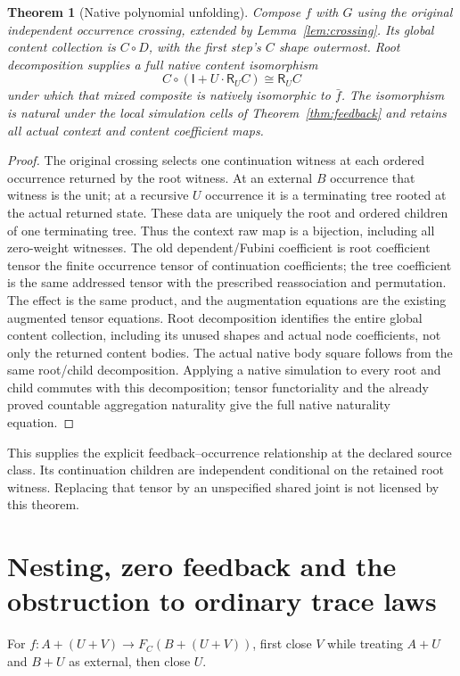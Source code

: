 \documentclass[11pt]{article}
\newtheorem{theorem}{Theorem}\newtheorem{lemma}[theorem]{Lemma}\newtheorem{proposition}[theorem]{Proposition}
\newcommand{\R}{\mathsf R}\newcommand{\Col}{\mathsf{Col}}\newcommand{\Vect}{\mathbf{Vect}_k}
\begin{document}
\begin{theorem}[Native polynomial unfolding]\label{thm:unfolding}
Compose $f$ with $G$ using the original independent occurrence crossing, extended by Lemma~\ref{lem:crossing}. Its global content collection is $C\circ D$, with the first step's $C$ shape outermost. Root decomposition supplies a full native content isomorphism
\[
 C\circ(\mathsf I+U\cdot\R_U C)\cong\R_U C
\]
under which that mixed composite is natively isomorphic to $\bar f$. The isomorphism is natural under the local simulation cells of Theorem~\ref{thm:feedback} and retains all actual context and content coefficient maps.
\end{theorem}
\begin{proof}
The original crossing selects one continuation witness at each ordered occurrence returned by the root witness. At an external $B$ occurrence that witness is the unit; at a recursive $U$ occurrence it is a terminating tree rooted at the actual returned state. These data are uniquely the root and ordered children of one terminating tree. Thus the context raw map is a bijection, including all zero-weight witnesses. The old dependent/Fubini coefficient is root coefficient tensor the finite occurrence tensor of continuation coefficients; the tree coefficient is the same addressed tensor with the prescribed reassociation and permutation. The effect is the same product, and the augmentation equations are the existing augmented tensor equations. Root decomposition identifies the entire global content collection, including its unused shapes and actual node coefficients, not only the returned content bodies. The actual native body square follows from the same root/child decomposition. Applying a native simulation to every root and child commutes with this decomposition; tensor functoriality and the already proved countable aggregation naturality give the full native naturality equation.
\end{proof}
This supplies the explicit feedback--occurrence relationship at the declared source class. Its continuation children are independent conditional on the retained root witness. Replacing that tensor by an unspecified shared joint is not licensed by this theorem.

\section{Nesting, zero feedback and the obstruction to ordinary trace laws}
For $f:A+(U+V)\to F_C(B+(U+V))$, first close $V$ while treating $A+U$ and $B+U$ as external, then close $U$.
\end{document}
